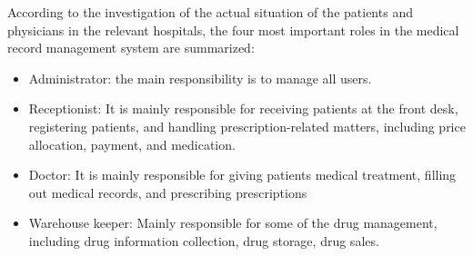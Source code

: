 According to the investigation of the actual situation of the patients and physicians in the relevant hospitals, the four most important roles in the medical record management system are summarized:
\begin{itemize}
    \item Administrator: the main responsibility is to manage all users.
    \item Receptionist: It is mainly responsible for receiving patients at the front desk, registering patients, and handling prescription-related matters, including price allocation, payment, and medication.
    \item Doctor: It is mainly responsible for giving patients medical treatment, filling out medical records, and prescribing prescriptions
    \item Warehouse keeper: Mainly responsible for some of the drug management, including drug information collection, drug storage, drug sales.

\end{itemize}

